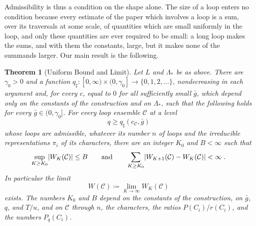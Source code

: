 \documentclass[11pt]{preprint}
\DeclarePairedDelimiter{\abs}{\lvert}{\rvert}
\numberwithin{equation}{section}
\newtheorem{theorem}{Theorem}[section]
\theoremstyle{definition}
\theoremstyle{remark}
\theoremstyle{plain}
\begin{document}
Admissibility is thus a condition on the shape alone. The size of a loop enters no condition because every estimate of the paper which involves a loop is a sum, over its traversals at some scale, of quantities which are small uniformly in the loop, and only these quantities are ever required to be small: a long loop makes the sums, and with them the constants, large, but it makes none of the summands larger. Our main result is the following.

\begin{theorem}[Uniform Bound and Limit]\label{thm:main}
Let $L$ and $\Lambda_*$ be as above. There are $\gamma_0 > 0$ and a function $q_\sharp \colon [0, \infty) \times (0, \gamma_0] \to \{ 0, 1, 2, \dots \}$, nondecreasing in each argument and, for every $c$, equal to $0$ for all sufficiently small $\bar g$, which depend only on the constants of the construction and on $\Lambda_*$, such that the following holds for every $\bar g \in (0, \gamma_0]$. For every loop ensemble $\mathcal C$ at a level
\begin{equation}\label{eq:level-condition}
    q \geq q_\sharp(c_{\mathcal C}, \bar g)
\end{equation}
whose loops are admissible, whatever its number $n$ of loops and the irreducible representations $\pi_i$ of its characters, there are an integer $K_0$ and $B < \infty$ such that
\begin{equation}\label{eq:main-bound}
    \sup_{K \geq K_0}\abs{W_K(\mathcal C)} \leq B
    \qquad\text{and}\qquad
    \sum_{K \geq K_0}\abs{W_{K+1}(\mathcal C) - W_K(\mathcal C)} < \infty\;.
\end{equation}
In particular the limit
\begin{equation}\label{eq:main-limit}
    W(\mathcal C) \coloneqq \lim_{K \to \infty}W_K(\mathcal C)
\end{equation}
exists. The numbers $K_0$ and $B$ depend on the constants of the construction, on $\bar g$, $q$, and $T/u$, and on $\mathcal C$ through $n$, the characters, the ratios $P(C_i)/r(C_i)$, and the numbers $P_q(C_i)$.
\end{theorem}
\end{document}
